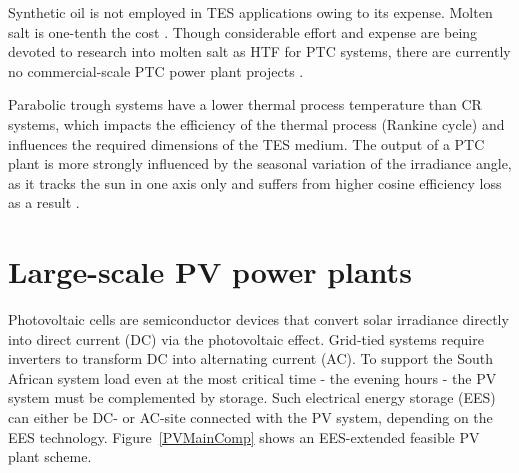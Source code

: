 Synthetic oil is not employed in TES applications owing to its expense. Molten salt is one-tenth the cost \cite{Gil2010}. Though considerable effort and expense are being devoted to research into molten salt as HTF for PTC systems, there are currently no commercial-scale PTC power plant projects \cite{Maccari2015}.

%

Parabolic trough systems have a lower thermal process temperature than CR systems, which impacts the efficiency of the thermal process (Rankine cycle) and influences the required dimensions of the TES medium. The output of a PTC plant is more strongly influenced by the seasonal variation of the irradiance angle, as it tracks the sun in one axis only and suffers from higher cosine efficiency loss as a result \cite{Jorgenson2013}.

\section{Large-scale PV power plants}\label{Large scale photo voltaic (PV) power plants}

Photovoltaic cells are semiconductor devices that convert solar irradiance directly into direct current (DC) via the photovoltaic effect.
Grid-tied systems require inverters to transform DC into alternating current (AC). To support the South African system load even at the most critical time - the evening hours - the PV system must be complemented by storage. Such electrical energy storage (EES) can either be DC- or AC-site connected with the PV system, depending on the EES technology. Figure~\ref{PVMainComp} shows an EES-extended feasible PV plant scheme.


